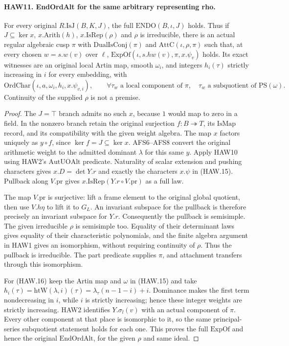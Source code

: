 \paragraph{HAW11. EndOrdAlt for the same arbitrary representing rho.}
\label{claim:HAW11}
For every original $R.\mathrm{IsJ}(B,K,J)$, the full
$\mathrm{ENDO}(B,\iota,J)$ holds.  Thus if $J\subseteq\ker x$,
$x.\mathrm{Arith}(h)$, $x.\mathrm{IsRep}(\rho)$ and $\rho$
is irreducible, there is an actual regular algebraic cusp
$\pi$ with $\mathrm{DualIsConj}(\pi)$ and
$\mathrm{AttC}(\iota,\rho,\pi)$ such that, at every chosen
$w=s.w(v)$ over $\ell$, $\mathrm{ExpOf}(\iota,s.hw(v),
\pi,x.\psi_v)$ holds.  Its exact witnesses are an original
local Artin map, smooth $\omega_i$, and integers $h_i(\tau)$
strictly increasing in $i$ for every embedding, with
\[
 \mathrm{OrdChar}(\iota,a,\omega_i,h_i,x.\psi_{v,i}),\qquad
 \forall\tau_w\text{ a local component of }\pi,\quad
                 \tau_w\text{ a subquotient of }\mathrm{PS}(\omega).
 \tag{HAW.16}
\]
Continuity of the supplied $\rho$ is not a premise.
\begin{proof}
The $J=\top$ branch admits no such $x$, because $1$ would
map to zero in a field.  In the nonzero branch retain the
original surjection $f:B\twoheadrightarrow T$, its
$\mathrm{IsMap}$ record, and its compatibility with the
given weight algebra.  The map $x$ factors uniquely as
$y\circ f$, since $\ker f=J\subseteq\ker x$.
AFS6--AFS8 convert the original arithmetic weight to the
admitted dominant $\lambda$ for this same $y$.
Apply HAW10 using HAW2's $\mathrm{AutUOAlt}$ predicate.
Naturality of scalar extension and pushing characters gives
$x.D=\det Y.r$ and exactly the characters $x.\psi$ in
(HAW.15).  Pullback along $V.\mathrm{pr}$ gives
$x.\mathrm{IsRep}(Y.r\circ V.\mathrm{pr})$ as a full law.

The map $V.\mathrm{pr}$ is surjective: lift a frame element
to the original global quotient, then use $V.h\eta$ to lift
it to $G_L$.  An invariant subspace for the pullback is
therefore precisely an invariant subspace for $Y.r$.
Consequently the pullback is semisimple.  The given
irreducible $\rho$ is semisimple too.  Equality of their
determinant laws gives equality of their characteristic
polynomials, and the finite algebra argument in HAW1 gives
an isomorphism, without requiring continuity of $\rho$.
Thus the pullback is irreducible.  The part predicate supplies
$\pi$, and attachment transfers through this isomorphism.

For (HAW.16) keep the Artin map and $\omega$ in (HAW.15)
and take
$h_i(\tau)=\mathrm{htW}(\lambda,i)(\tau)
=\lambda_\tau(n-1-i)+i$.
Dominance makes the first term nondecreasing in $i$, while
$i$ is strictly increasing; hence these integer weights are
strictly increasing.  HAW2 identifies $Y.\sigma_l(v)$ with
an actual component of $\pi$.  Every other component at
that place is isomorphic to it, so the same
principal-series subquotient statement holds for each one.
This proves the full $\mathrm{ExpOf}$ and hence the original
$\mathrm{EndOrdAlt}$, for the given $\rho$ and same ideal.
\end{proof}

